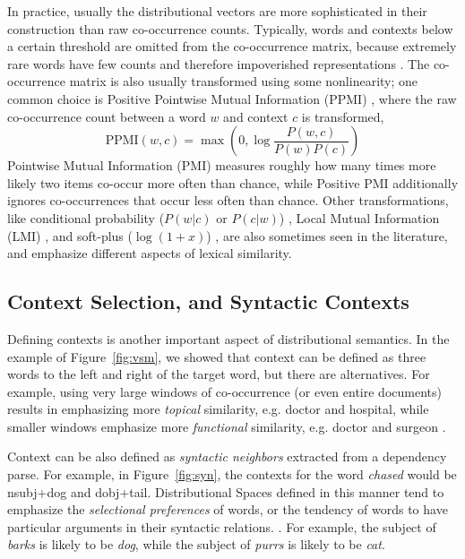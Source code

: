 In practice, usually the distributional vectors are more sophisticated in their
construction than raw co-occurrence counts.  Typically, words and contexts
below a certain threshold are omitted from the co-occurrence matrix, because
extremely rare words have few counts and therefore impoverished representations
\cite{turney:2010:jair}. The co-occurrence matrix is also usually transformed
using some nonlinearity; one common choice is Positive Pointwise Mutual
Information (PPMI) \cite{bullinaria:2007:brm}, where the raw co-occurrence count
between a word $w$ and context $c$ is transformed,
\begin{equation*}
  \text{PPMI}(w, c) = \max\left(0, \log\frac{P(w, c)}{P(w)P(c)}\right)
\end{equation*}
Pointwise Mutual Information (PMI) measures roughly how many times more likely two
items co-occur more often than chance, while Positive PMI
additionally ignores co-occurrences that occur less often than chance.  Other
transformations, like conditional probability ($P(w|c)$ or $P(c|w)$)
\cite{hofman:1999:sigir,blei:2003:jmlr}, Local Mutual Information (LMI)
\cite{evert:2005:phd}, and soft-plus ($\log(1 + x)$)
\cite{pennington:2014:emnlp}, are also sometimes seen in the literature, and
emphasize different aspects of lexical similarity.

\subsection{Context Selection, and Syntactic Contexts}
\label{sec:contextselection}
Defining contexts is another important aspect of distributional semantics.
In the example of Figure~\ref{fig:vsm}, we showed that context can be defined
as three words to the left and right of the target word, but there are
alternatives. For example, using very large windows of co-occurrence (or even
entire documents) results in emphasizing more {\em topical} similarity, e.g. doctor
and hospital, while smaller windows emphasize more {\em functional} similarity, e.g.
doctor and surgeon
\cite{peirsman:2008:essli,agirre:2009:naacl}.

Context can be also defined as {\em syntactic neighbors} extracted from a
dependency parse. For example, in Figure~\ref{fig:syn}, the
contexts for the word {\em chased} would be {\ctx nsubj+dog} and {\ctx
dobj+tail}. Distributional Spaces defined in this manner tend to emphasize the
{\em selectional preferences} of words, or the tendency of words to have
particular arguments in their syntactic relations.
\cite{pado:2007:cl,baroni:2010:cl,levy:2014:acl}. For example,
the subject of {\em barks} is likely to be {\em dog}, while the subject of {\em
purrs} is likely to be {\em cat}.


